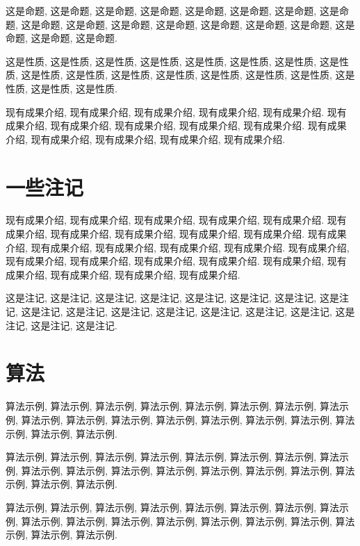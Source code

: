 \documentclass[UTF8,openright]{ctexbook}
\begin{document}
\begin{proposition}
  这是命题, 这是命题, 这是命题, 这是命题, 这是命题, 这是命题,
  这是命题, 这是命题, 这是命题, 这是命题, 这是命题, 这是命题,
  这是命题, 这是命题, 这是命题, 这是命题, 这是命题, 这是命题.
\end{proposition}

\begin{property}
  这是性质, 这是性质, 这是性质, 这是性质, 这是性质, 这是性质,
  这是性质, 这是性质, 这是性质, 这是性质, 这是性质, 这是性质,
  这是性质, 这是性质, 这是性质, 这是性质, 这是性质, 这是性质.
\end{property}

现有成果介绍, 现有成果介绍, 现有成果介绍, 现有成果介绍, 现有成果介绍.
现有成果介绍, 现有成果介绍, 现有成果介绍, 现有成果介绍, 现有成果介绍.
现有成果介绍, 现有成果介绍, 现有成果介绍, 现有成果介绍, 现有成果介绍.


\section{一些注记}
现有成果介绍, 现有成果介绍, 现有成果介绍, 现有成果介绍, 现有成果介绍.
现有成果介绍, 现有成果介绍, 现有成果介绍, 现有成果介绍, 现有成果介绍.
现有成果介绍, 现有成果介绍, 现有成果介绍, 现有成果介绍, 现有成果介绍.
现有成果介绍, 现有成果介绍, 现有成果介绍, 现有成果介绍, 现有成果介绍.
现有成果介绍, 现有成果介绍, 现有成果介绍, 现有成果介绍, 现有成果介绍.

\begin{remark}
  这是注记, 这是注记, 这是注记, 这是注记, 这是注记, 这是注记,
  这是注记, 这是注记, 这是注记, 这是注记, 这是注记, 这是注记,
  这是注记, 这是注记, 这是注记, 这是注记, 这是注记, 这是注记.
\end{remark}

\section{算法}
算法示例, 算法示例, 算法示例, 算法示例, 算法示例, 算法示例,
算法示例, 算法示例, 算法示例, 算法示例, 算法示例, 算法示例,
算法示例, 算法示例, 算法示例, 算法示例, 算法示例, 算法示例.

算法示例, 算法示例, 算法示例, 算法示例, 算法示例, 算法示例,
算法示例, 算法示例, 算法示例, 算法示例, 算法示例, 算法示例,
算法示例, 算法示例, 算法示例, 算法示例, 算法示例, 算法示例.

算法示例, 算法示例, 算法示例, 算法示例, 算法示例, 算法示例,
算法示例, 算法示例, 算法示例, 算法示例, 算法示例, 算法示例,
算法示例, 算法示例, 算法示例, 算法示例, 算法示例, 算法示例.
\end{document}

